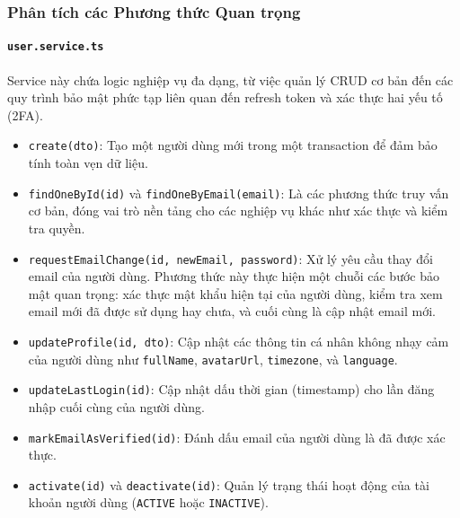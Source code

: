 \subsubsection{Phân tích các Phương thức Quan trọng}

\paragraph{\texttt{user.service.ts}}
Service này chứa logic nghiệp vụ đa dạng, từ việc quản lý CRUD cơ bản đến các quy trình bảo mật phức tạp liên quan đến refresh token và xác thực hai yếu tố (2FA).

\begin{itemize}
    \item \texttt{create(dto)}: Tạo một người dùng mới trong một transaction để đảm bảo tính toàn vẹn dữ liệu.
    
    \item \texttt{findOneById(id)} và \texttt{findOneByEmail(email)}: Là các phương thức truy vấn cơ bản, đóng vai trò nền tảng cho các nghiệp vụ khác như xác thực và kiểm tra quyền.
    
    \item \texttt{requestEmailChange(id, newEmail, password)}: Xử lý yêu cầu thay đổi email của người dùng. Phương thức này thực hiện một chuỗi các bước bảo mật quan trọng: xác thực mật khẩu hiện tại của người dùng, kiểm tra xem email mới đã được sử dụng hay chưa, và cuối cùng là cập nhật email mới.
    
    \item \texttt{updateProfile(id, dto)}: Cập nhật các thông tin cá nhân không nhạy cảm của người dùng như \texttt{fullName}, \texttt{avatarUrl}, \texttt{timezone}, và \texttt{language}.
    
    \item \texttt{updateLastLogin(id)}: Cập nhật dấu thời gian (timestamp) cho lần đăng nhập cuối cùng của người dùng.
    
    \item \texttt{markEmailAsVerified(id)}: Đánh dấu email của người dùng là đã được xác thực.
    
    \item \texttt{activate(id)} và \texttt{deactivate(id)}: Quản lý trạng thái hoạt động của tài khoản người dùng (\texttt{ACTIVE} hoặc \texttt{INACTIVE}).
    

\end{itemize}
